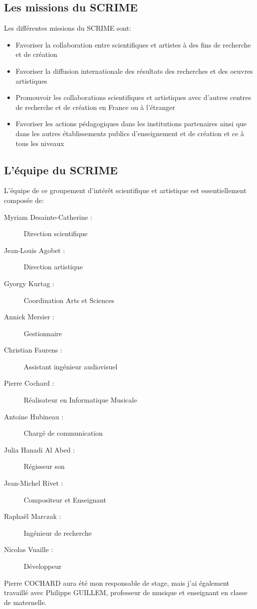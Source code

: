 \documentclass[a4paper, 12pt]{report}
\begin{document}
\subsection{Les missions du SCRIME \cite{scrime2015}}
Les différentes missions du SCRIME sont:
\begin{itemize}
\item Favoriser la collaboration entre scientifiques et artistes à des fins de recherche et de création
\item Favoriser la diffusion internationale des résultats des recherches et des oeuvres artistiques
\item Promouvoir les collaborations scientifiques et artistiques avec d'autres centres de recherche et de création en France ou à l'étranger
\item Favoriser les actions pédagogiques dans les institutions partenaires ainsi que dans les autres établissements publics d'enseignement et de création et ce à tous les niveaux 
\end{itemize}

\subsection{L'équipe du SCRIME \cite{scrime2015}}
L'équipe de ce groupement d'intérêt scientifique et artistique est essentiellement composée de:
\begin{description}
\item[Myriam Desainte-Catherine :] Direction scientifique
\item[Jean-Louis Agobet :] Direction artistique
\item[Gyorgy Kurtag :] Coordination Arts et Sciences
\item[Annick Mersier :] Gestionnaire
\item[Christian Faurens :] Assistant ingénieur audiovisuel
\item[Pierre Cochard :] Réalisateur en Informatique Musicale
\item[Antoine Hubineau :] Chargé de communication
\item[Julia Hanadi Al Abed :] Régisseur son
\item[Jean-Michel Rivet :] Compositeur et Enseignant
\item[Raphaël Marczak :] Ingénieur de recherche
\item[Nicolas Vuaille :] Développeur
\end{description}
Pierre COCHARD  aura été mon responsable de stage, mais j'ai également travaillé avec Philippe GUILLEM, professeur de musique et enseignant en classe de maternelle.
\end{document}
